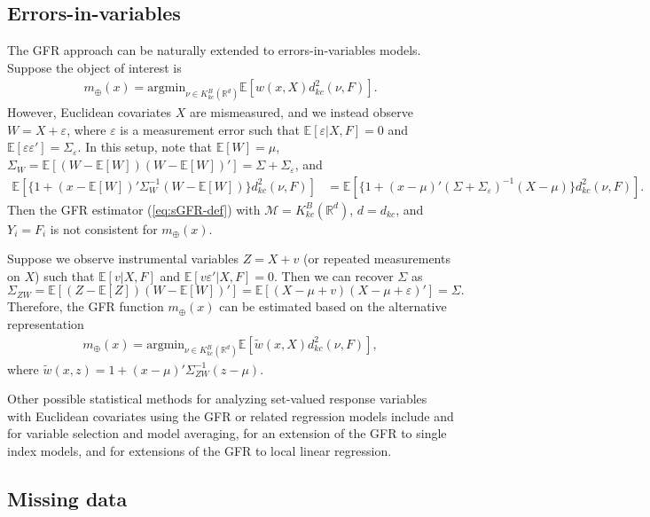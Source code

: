 \documentclass[11pt,reqno]{amsart}
\begin{document}
\subsection{Errors-in-variables}

The GFR approach can be naturally extended to errors-in-variables models. Suppose the object of interest is 
\begin{align*}
m_\oplus(x)=\mathrm{argmin}_{\nu\in K_{kc}^B(\mathbb{R}^d)}\mathbb{E}[w(x,X)d_{kc}^2(\nu,F)].
\end{align*}
However, Euclidean covariates $X$ are mismeasured, and we instead observe $W = X + \varepsilon$, where $\varepsilon$ is a measurement error such that $\mathbb{E}[\varepsilon|X,F]=0$ and $\mathbb{E}[\varepsilon \varepsilon'] = \Sigma_\varepsilon$. In this setup, note that $\mathbb{E}[W]=\mu$, $\Sigma_W = \mathbb{E}[(W - \mathbb{E}[W])(W - \mathbb{E}[W])']=\Sigma + \Sigma_\varepsilon$, and 
\begin{align*}
\mathbb{E}[\{1 + (x-\mathbb{E}[W])'\Sigma_W^{-1}(W - \mathbb{E}[W])\}d_{kc}^2(\nu,F)]
&= \mathbb{E}[\{1 + (x-\mu)'(\Sigma + \Sigma_\varepsilon)^{-1}(X - \mu)\}d_{kc}^2(\nu,F)].
\end{align*}
Then the GFR estimator (\ref{eq:sGFR-def}) with $\mathcal{M}=K_{kc}^B(\mathbb{R}^d)$, $d=d_{kc}$, and $Y_i=F_i$ is not consistent for $m_\oplus(x)$.

Suppose we observe instrumental variables $Z = X + v$ (or repeated measurements on $X$) such that $\mathbb{E}[v|X,F]$ and $\mathbb{E}[v\varepsilon'|X,F]=0$.  Then we can recover $\Sigma$ as 
\[
\Sigma_{ZW}=\mathbb{E}[(Z-\mathbb{E}[Z])(W-\mathbb{E}[W])'] = \mathbb{E}[(X-\mu + v)(X - \mu + \varepsilon)'] = \Sigma. 
\]
Therefore, the GFR function $m_\oplus(x)$ can be estimated based on the alternative representation
\begin{align*}
m_\oplus(x)=\mathrm{argmin}_{\nu\in K_{kc}^B(\mathbb{R}^d)}\mathbb{E}[\tilde{w}(x,X)d_{kc}^2(\nu,F)],
\end{align*}
where $\tilde{w}(x,z) = 1 + (x-\mu)'\Sigma_{ZW}^{-1}(z -\mu)$. 

Other possible statistical methods for analyzing set-valued response variables with Euclidean covariates using the GFR or related regression models include \cite{TuWuMu23} and \cite{KuOt25} for variable selection and model averaging, \cite{BhMu23} for an extension of the GFR to single index models, \cite{PeMu19} and \cite{ChMu22} for extensions of the GFR to local linear regression. 


\subsection{Missing data}
\end{document}
